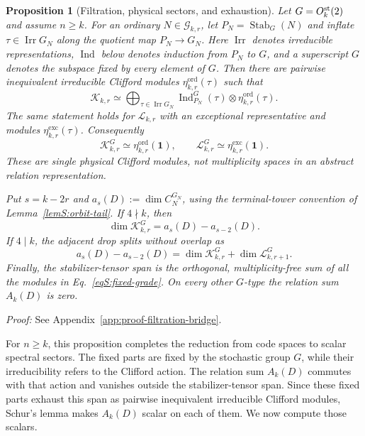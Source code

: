 \documentclass[journal,twocolumn]{IEEEtran}
\newtheorem{proposition}[theorem]{Proposition}
\theoremstyle{definition}
\theoremstyle{plain}
\newcommand{\Ord}{\mathrm{ord}}
\newcommand{\Exc}{\mathrm{exc}}
\newcommand{\cG}{\mathcal G}
\begin{document}
\begin{proposition}[Filtration, physical sectors, and exhaustion]
\label{propS:filtration-bridge}
Let $G=O_k^{\rm st}(2)$ and assume $n\geq k$.  For an ordinary
$N\in\cG_{k,r}$, let $P_N=\operatorname{Stab}_G(N)$ and inflate
$\tau\in\operatorname{Irr}G_N$ along the quotient map $P_N\to G_N$.
Here $\operatorname{Irr}$ denotes irreducible representations,
$\operatorname{Ind}$ below denotes induction from $P_N$ to $G$, and a
superscript $G$ denotes the subspace fixed by every element of $G$.
Then there are pairwise inequivalent irreducible Clifford modules
$\eta^{\Ord}_{k,r}(\tau)$ such that
\begin{equation}
 \mathcal K_{k,r}\simeq
 \bigoplus_{\tau\in\operatorname{Irr}G_N}
 \operatorname{Ind}_{P_N}^{G}(\tau)\otimes
 \eta^{\Ord}_{k,r}(\tau).
 \label{eqS:induced-grade}
\end{equation}
The same statement holds for $\mathcal L_{k,r}$ with an exceptional
representative and modules $\eta^{\Exc}_{k,r}(\tau)$.  Consequently
\begin{equation}
 \mathcal K_{k,r}^{G}\simeq\eta^{\Ord}_{k,r}(\bm1),\qquad
 \mathcal L_{k,r}^{G}\simeq\eta^{\Exc}_{k,r}(\bm1).
 \label{eqS:fixed-grade}
\end{equation}
These are single physical Clifford modules, not multiplicity spaces in an
abstract relation representation.

Put $s=k-2r$ and
$a_s(D):=\dim C_N^{G_N}$, using the terminal-tower convention of
Lemma~\ref{lemS:orbit-tail}.  If $4\nmid k$, then
\begin{equation}
 \dim\mathcal K_{k,r}^{G}=a_s(D)-a_{s-2}(D).
 \label{eqS:adjacent-difference}
\end{equation}
If $4\mid k$, the adjacent drop splits without overlap as
\begin{equation}
 a_s(D)-a_{s-2}(D)
 =\dim\mathcal K_{k,r}^{G}
  +\dim\mathcal L_{k,r+1}^{G}.
 \label{eqS:ordinary-exceptional-split}
\end{equation}
Finally, the stabilizer-tensor span is the orthogonal, multiplicity-free sum
of all the modules in Eq.~\eqref{eqS:fixed-grade}.  On every other
$G$-type the relation sum $A_k(D)$ is zero.
\end{proposition}

\noindent\emph{Proof:} See Appendix~\ref{app:proof-filtration-bridge}.\par

For $n\geq k$, this proposition completes the reduction from code spaces
to scalar spectral sectors.  The fixed parts are fixed by the stochastic
group $G$, while their irreducibility refers to the Clifford action.
The relation sum $A_k(D)$ commutes with that action and vanishes outside
the stabilizer-tensor span.  Since these fixed parts exhaust this span as
pairwise inequivalent irreducible Clifford modules, Schur's lemma makes
$A_k(D)$ scalar on each of them.  We now compute those scalars.
\end{document}
